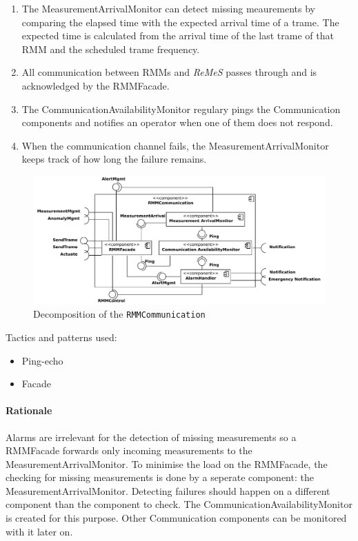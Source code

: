 \documentclass[a4paper,10pt]{article}
\newcommand{\rem}{\emph{ReMeS}\xspace}
\begin{document}
\begin{enumerate}
	\item The MeasurementArrivalMonitor can detect missing meaurements by comparing the elapsed time with the expected arrival time of a trame. The expected time is calculated from the arrival time of the last trame of that RMM and the scheduled trame frequency.
    \item All communication between RMMs and \rem passes through and is acknowledged by the RMMFacade.
    \item The CommunicationAvailabilityMonitor regulary pings the Communication components and notifies an operator when one of them does not respond.
    \item When the communication channel fails, the MeasurementArrivalMonitor keeps track of how long the failure remains.
\end{enumerate}

\begin{figure}[!htp]
    \centering
    \includegraphics[width=\textwidth]{Decomposition__Communication_with_RMM}
    \caption{Decomposition of the \texttt{RMMCommunication}}\label{fig:dec_rmmcomm}
\end{figure}

\noindent Tactics and patterns used:
\begin{itemize}
	\item Ping-echo
    \item Facade
\end{itemize}

\paragraph{Rationale} Alarms are irrelevant for the detection of missing measurements so a RMMFacade forwards only incoming measurements to the MeasurementArrivalMonitor. To minimise the load on the RMMFacade, the checking for missing measurements is done by a seperate component: the MeasurementArrivalMonitor. Detecting failures should happen on a different component than the component to check. The CommunicationAvailabilityMonitor is created for this purpose. Other Communication components can be monitored with it later on.
\end{document}
